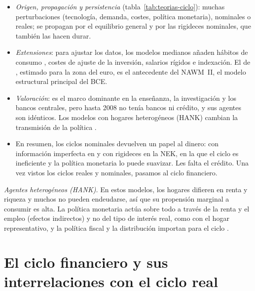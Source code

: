 \documentclass[11pt]{article}
\begin{document}
\begin{itemize}
\item \emph{Origen, propagación y persistencia} (tabla~\ref{tab:teorias-ciclo}): muchas perturbaciones (tecnología, demanda, costes, política monetaria), nominales o reales; se propagan por el equilibrio general y por las rigideces nominales, que también las hacen durar.
\item \emph{Extensiones}: para ajustar los datos, los modelos medianos añaden hábitos de consumo , costes de ajuste de la inversión, salarios rígidos e indexación\nocite{ChristianoEichenbaumEvans2005,SmetsWouters2003Estimated}. El de \textcite{SmetsWouters2003Estimated}, estimado para la zona del euro, es el antecedente del NAWM~II, el modelo estructural principal del BCE\nocite{CoenenEtAl2018NAWM}.
\item \emph{Valoración}: es el marco dominante en la enseñanza, la investigación y los bancos centrales\nocite{Gali2018State}, pero hasta 2008 no tenía bancos ni crédito, y sus agentes son idénticos. Los modelos con hogares heterogéneos (HANK) cambian la transmisión de la política\nocite{KaplanMollViolante2018Monetary} .
\item En resumen, los ciclos nominales devuelven un papel al dinero: con información imperfecta en  y con rigideces en la NEK, en la que el ciclo es ineficiente y la política monetaria lo puede suavizar. Les falta el crédito. Una vez vistos los ciclos reales y nominales, pasamos al ciclo financiero.
\end{itemize}

\begin{anotaciones}
\emph{Agentes heterogéneos (HANK).} En estos modelos, los hogares difieren en renta y riqueza y muchos no pueden endeudarse, así que su propensión marginal a consumir es alta. La política monetaria actúa sobre todo a través de la renta y el empleo (efectos indirectos) y no del tipo de interés real, como con el hogar representativo, y la política fiscal y la distribución importan para el ciclo\nocite{KaplanMollViolante2018Monetary} .
\end{anotaciones}

\section{El ciclo financiero y sus interrelaciones\cortetitulo{} con el ciclo real}\label{sec:ciclo-financiero}
\end{document}
